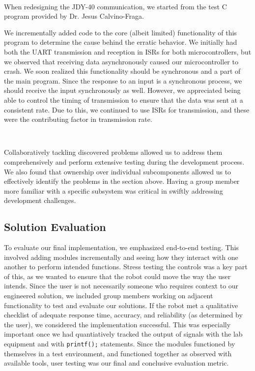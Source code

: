 \documentclass{article}
\begin{document}
\

When redesigning the JDY-40 communication, we started from the test C program provided by Dr. Jesus Calvino-Fraga.

We incrementally added code to the core (albeit limited) functionality of this program to determine the cause behind
the erratic behavior. We initially had both the UART transmission and reception in ISRs for both microcontrollers, but we observed that receiving data asynchronously
caused our microcontroller to crash. We soon realized this functionality should be synchronous and a part of the main program.
Since the response to an input is a synchronous process, we should receive the input synchronously as well. However, we appreciated being able to
control the timing of transmission to ensure that the data was sent at a consistent rate. Due to this, we continued to use ISRs for transmission,
and these were the contributing factor in transmission rate.

\

Collaboratively tackling discovered problems allowed us to address them comprehensively and perform extensive testing during the
development process. We also found that ownership over individual subcomponents allowed us to effectively identify the problems in the section above. Having a group member
more familiar with a specific subsystem was critical in swiftly addressing development challenges.


\subsection{Solution Evaluation}

To evaluate our final implementation, we emphasized end-to-end testing. This involved adding modules incrementally and seeing how they interact with one another to
perform intended functions. Stress testing the controls was a key part of this, as we wanted to ensure that the robot could move the way the user intends. Since the user is not necessarily someone who
requires context to our engineered solution, we included group members working on adjacent functionality to test and evaluate our solutions. If the robot met a qualitative checklist
of adequate response time, accuracy, and reliability (as determined by the user), we considered the implementation successful. This was especially important once we had quantiatively tracked the
output of signals with the lab equipment and with \texttt{printf();} statements. Since the modules functioned by themselves in a test environment, and functioned together as observed with
available tools, user testing was our final and conclusive evaluation metric.
\end{document}
